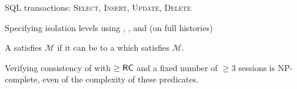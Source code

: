 
\begin{frame}{}
	\begin{center}

		\vspace{0.50cm}
		SQL transactions: \textsc{Select, Insert, Update, Delete}

		\pause
		\vspace{0.50cm}
	\end{center}
\end{frame}

\begin{frame}{}
	\begin{center}

		\begin{center}
		\end{center}

		\pause
	\end{center}
\end{frame}

\begin{frame}{}
	\begin{center}
		Specifying isolation levels
		using \textsf{}, \textsf{}, and \textsf{}
		(on full histories)
	\end{center}
\end{frame}

\begin{frame}{}
	\begin{definition}
		A  satisfies $\mathcal{M}$
		if it can be  to a  which satisfies $\mathcal{M}$.
	\end{definition}


	\pause
	\begin{theorem}
		Verifying consistency of 
		with $\ge \textsf{RC}$ and a fixed number of $\ge 3$ sessions
		is \textsf{NP-complete},
		even  of the complexity of these predicates.
	\end{theorem}
\end{frame}

